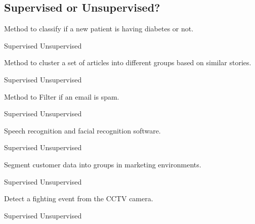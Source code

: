 \subsection{Supervised or Unsupervised?}
\small{
\begin{questions} %
\question Method to classify if a new patient is having diabetes or not.\\
\begin{oneparchoices}
 \choice  Supervised
 \choice  Unsupervised
\end{oneparchoices}
\question Method to cluster a set of articles into different groups based on similar stories. \\
\begin{oneparchoices}
 \choice  Supervised
 \choice  Unsupervised
\end{oneparchoices}
\question Method to Filter if an email is spam. \\
\begin{oneparchoices}
 \choice  Supervised
 \choice  Unsupervised
\end{oneparchoices}
\question Speech recognition and facial recognition software.\\
\begin{oneparchoices}
 \choice  Supervised
 \choice  Unsupervised
\end{oneparchoices}
\question Segment customer data into groups in marketing environments.\\
\begin{oneparchoices}
 \choice  Supervised
 \choice  Unsupervised
\end{oneparchoices}
\question Detect a fighting event from the CCTV camera.
\begin{oneparchoices}
 \choice  Supervised
 \choice  Unsupervised
\end{oneparchoices}
\end{questions}
}

